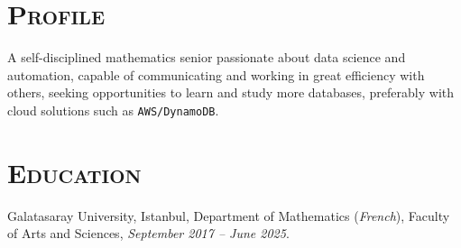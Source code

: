 \documentclass[oneside, 11pt]{memoir}
\begin{document}
\pagestyle{empty}
\section*{\textsc{Profile}}
\noindent
A self-disciplined mathematics senior passionate about data science and
automation, capable of communicating and working in great
efficiency with others, seeking opportunities to learn and study more
databases, preferably with cloud solutions such as \texttt{AWS/DynamoDB}.
\section*{\textsc{Education}}
\noindent
Galatasaray University, Istanbul, Department of Mathematics
(\textit{French}), Faculty of
Arts and Sciences, \textit{September 2017 -- June 2025}.
%
\end{document}

